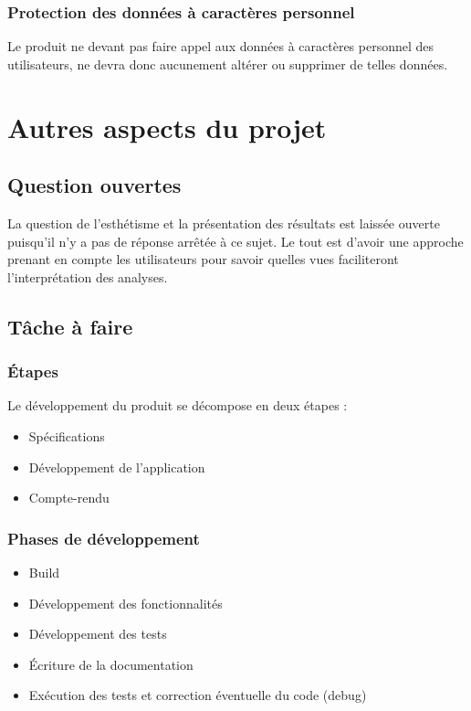 			\subsubsection{Protection des données à caractères personnel}
			Le produit ne devant pas faire appel aux données à caractères personnel des utilisateurs, ne devra donc aucunement altérer ou supprimer de telles données.		
		
	\section{Autres aspects du projet}
		\subsection{Question ouvertes}
			La question de l'esthétisme et la présentation des résultats est laissée ouverte puisqu'il n'y a pas de réponse arrêtée à ce sujet. Le tout est d'avoir une approche prenant en compte les utilisateurs pour savoir quelles vues faciliteront l'interprétation des analyses.

		\subsection{Tâche à faire}
			\subsubsection{Étapes}
			Le développement du produit se décompose en deux étapes :
				\begin{itemize}
				\item Spécifications
				\item Développement de l'application
				\item Compte-rendu
				\end{itemize}
				
			\subsubsection{Phases de développement}
				\begin{itemize}
				\item Build
				\item Développement des fonctionnalités
				\item Développement des tests
				\item Écriture de la documentation
				\item Exécution des tests et correction éventuelle du code (debug)
				\end{itemize}
				
